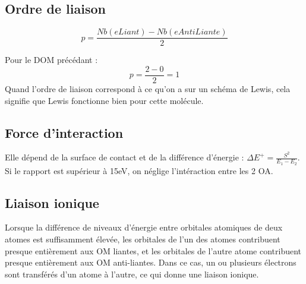 \documentclass[french]{yLectureNote}
\begin{document}
\subsection{Ordre de liaison}
\[p = \frac{Nb(eLiant)-Nb(eAntiLiante)}{2}\]

Pour le DOM précédant : \[p = \frac{2-0}{2} = 1\] Quand l'ordre de liaison correspond à ce qu'on a sur un schéma de Lewis, cela signifie que Lewis fonctionne bien pour cette molécule.
\subsection{Force d'interaction}
Elle dépend de la surface de contact et de la différence d'énergie : $\Delta E^+ = \frac{S^2}{E_1-E_2}$. Si le rapport est supérieur à 15eV, on néglige l'intéraction entre les 2 OA.
\subsection{Liaison ionique}
Lorsque la différence de niveaux d'énergie entre orbitales atomiques de deux atomes est suffisamment élevée, les orbitales de l'un des atomes contribuent presque entièrement aux OM liantes, et les orbitales de l'autre atome contribuent presque entièrement aux OM anti-liantes. Dans ce cas, un ou plusieurs électrons sont transférés d'un atome à l'autre, ce qui donne une liaison ionique.
\end{document}
